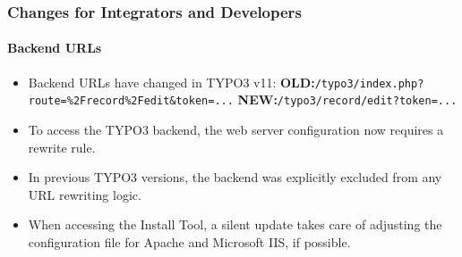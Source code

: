 %

\begin{frame}[fragile]
	\frametitle{Changes for Integrators and Developers}
	\framesubtitle{Backend URLs}

	\begin{itemize}
		\item Backend URLs have changed in TYPO3 v11:\newline
			\small
				\textbf{OLD:}\tabto{1.1cm}\texttt{/typo3/index.php?route=\%2Frecord\%2Fedit\&token=...}\newline
				\textbf{NEW:}\tabto{1.1cm}\texttt{/typo3/record/edit?token=...}
			\normalsize

		\item To access the TYPO3 backend, the web server configuration now
			requires a rewrite rule.
		\item In previous TYPO3 versions, the backend was explicitly excluded
			from any URL rewriting logic.
		\item When accessing the Install Tool, a silent update takes care of
			adjusting the configuration file for Apache and Microsoft IIS,
			if possible.

	\end{itemize}
\end{frame}

